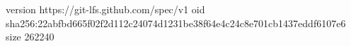 version https://git-lfs.github.com/spec/v1
oid sha256:22abfbd665f02f2d112c24074d1231be38f64e4c24c8e701cb1437eddf6107e6
size 262240

